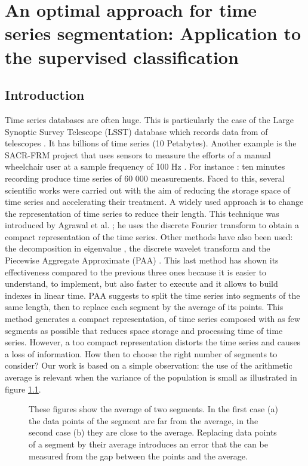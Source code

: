 \chapter{An optimal approach for time series segmentation: Application to the supervised classification}
\label{seg}
\section{Introduction}
Time series databases are often huge. This is particularly the case of the Large Synoptic Survey Telescope (LSST) database which records data from of telescopes \cite {lsst}. It has billions of time series (10 Petabytes). Another example is the  SACR-FRM project that uses sensors to measure the efforts of a  manual wheelchair user at a sample  frequency of 100 Hz \cite{SACR-FRM}. For instance :  ten minutes recording produce time series of 60 000 measurements. Faced to this, several scientific works were carried out with the aim of reducing the storage space of time series and accelerating their treatment.  A widely used approach is to change the representation of time series to reduce their length. This technique was introduced by Agrawal et al. \cite{Agrawal1993}; he uses the discrete Fourier transform to obtain a compact representation of the time series.
 Other methods have also been used: the decomposition in eigenvalue \cite{Wu1996}, the  discrete wavelet transform \cite{Chan1999} and the Piecewise Aggregate Approximate (PAA) \cite{keogh2001locally}. This last method has shown its effectiveness compared to the previous three ones because it is easier to understand, to implement, but also faster to execute and it allows to build indexes in linear time. PAA suggests to split the time series into segments of the same length, then to replace each segment by the average of its points. This method generates a compact representation, of time series composed with as few segments as possible that reduces space storage and processing time of time series.
 However, a too compact representation distorts the time series and causes a loss of information. How then to choose the right number of segments to consider? Our work is based on a simple observation: the use of the arithmetic average is relevant when the variance of the population is small as illustrated in figure \ref{fig:average22}.
 
 

\begin{figure}
\centering
{} 
\caption{These figures show the average of two segments. In the first
case (a) the data points of the segment are far from the average, in the second case (b) they are close to the average. Replacing data points of a segment by their average introduces an error that the can be measured from the gap between the points and the average. }

\label{fig:average22}
\end{figure}


